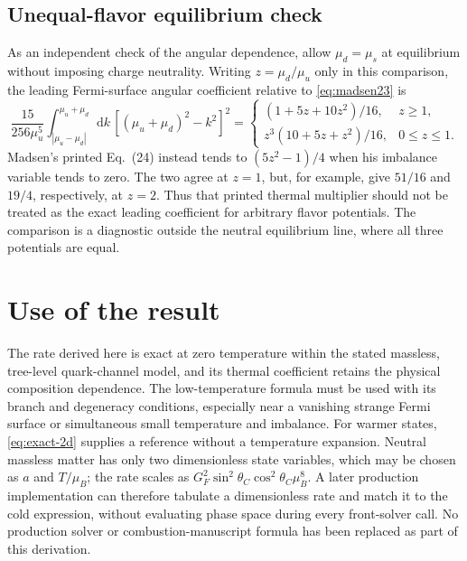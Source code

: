 \documentclass[11pt,letterpaper]{article}
\numberwithin{equation}{section}
\newcommand{\dd}{\mathrm d}
\begin{document}
\subsection{Unequal-flavor equilibrium check}
As an independent check of the angular dependence, allow \(\mu_d=\mu_s\) at equilibrium without imposing charge neutrality.
Writing \(z=\mu_d/\mu_u\) only in this comparison, the leading Fermi-surface angular coefficient relative to \cref{eq:madsen23} is
\begin{equation}
 \frac{15}{256\mu_u^5}
 \int_{|\mu_u-\mu_d|}^{\mu_u+\mu_d}\dd k\,
 [(\mu_u+\mu_d)^2-k^2]^2
 =\begin{cases}
 (1+5z+10z^2)/16,&z\geq1,\\
 z^3(10+5z+z^2)/16,&0\leq z\leq1.
 \end{cases}
 \label{eq:unequal-equilibrium}
\end{equation}
Madsen's printed Eq.~(24) instead tends to \((5z^2-1)/4\) when his imbalance variable tends to zero.
The two agree at \(z=1\), but, for example, give \(51/16\) and \(19/4\), respectively, at \(z=2\).
Thus that printed thermal multiplier should not be treated as the exact leading coefficient for arbitrary flavor potentials.
The comparison is a diagnostic outside the neutral equilibrium line, where all three potentials are equal.



\clearpage
\section{Use of the result}
The rate derived here is exact at zero temperature within the stated massless, tree-level quark-channel model, and its thermal coefficient retains the physical composition dependence.
The low-temperature formula must be used with its branch and degeneracy conditions, especially near a vanishing strange Fermi surface or simultaneous small temperature and imbalance.
For warmer states, \cref{eq:exact-2d} supplies a reference without a temperature expansion.
Neutral massless matter has only two dimensionless state variables, which may be chosen as \(a\) and \(T/\mu_B\); the rate scales as \(G_F^2\sin^2\theta_C\cos^2\theta_C\mu_B^8\).
A later production implementation can therefore tabulate a dimensionless rate and match it to the cold expression, without evaluating phase space during every front-solver call.
No production solver or combustion-manuscript formula has been replaced as part of this derivation.

\appendix




\end{document}
